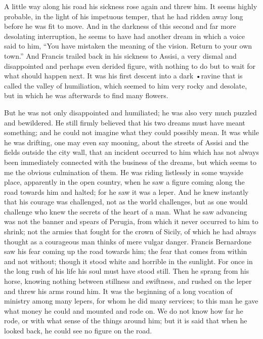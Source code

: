 \documentclass{book}
\begin{document}
A little way along his road his sickness rose again and threw him. It seems highly probable, in the light of his impetuous temper, that he had ridden away long before he was fit to move. And in the darkness of this second and far more desolating interruption, he seems to have had another dream in which a voice said to him, “You have mistaken the meaning of the vision. Return to your own town.” And Francis trailed back in his sickness to Assisi, a very dismal and disappointed and perhaps even derided figure, with nothing to do but to wait for what should happen next. It was his first descent into a dark •ravine that is called the valley of humiliation, which seemed to him very rocky and desolate, but in which he was afterwards to find many flowers.

But he was not only disappointed and humiliated; he was also very much puzzled and bewildered. He still firmly believed that his two dreams must have meant something; and he could not imagine what they could possibly mean. It was while he was drifting, one may even say mooning, about the streets of Assisi and the fields outside the city wall, that an incident occurred to him which has not always been immediately connected with the business of the dreams, but which seems to me the obvious culmination of them. He was riding listlessly in some wayside place, apparently in the open country, when he saw a figure coming along the road towards him and halted; for he saw it was a leper. And he knew instantly that his courage was challenged, not as the world challenges, but as one would challenge who knew the secrets of the heart of a man. What he saw advancing was not the banner and spears of Perugia, from which it never occurred to him to shrink; not the armies that fought for the crown of Sicily, of which he had always thought as a courageous man thinks of mere vulgar danger. Francis Bernardone saw his fear coming up the road towards him; the fear that comes from within and not without; though it stood white and horrible in the sunlight. For once in the long rush of his life his soul must have stood still. Then he sprang from his horse, knowing nothing between stillness and swiftness, and rushed on the leper and threw his arms round him. It was the beginning of a long vocation of ministry among many lepers, for whom he did many services; to this man he gave what money he could and mounted and rode on. We do not know how far he rode, or with what sense of the things around him; but it is said that when he looked back, he could see no figure on the road.
\end{document}
